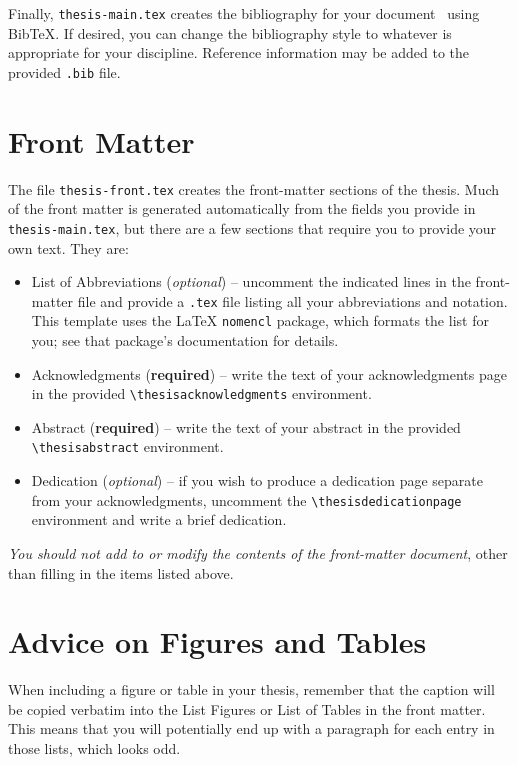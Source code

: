 Finally, \texttt{thesis-main.tex} creates the bibliography for your document~\cite{Lovecraft1928} using BibTeX. If desired, you can change the bibliography style to whatever is appropriate for your discipline. Reference information may be added to the provided \texttt{.bib} file.

\section{Front Matter}

The file \texttt{thesis-front.tex} creates the front-matter sections of the thesis.  Much of the front matter is generated automatically from the fields you provide in \texttt{thesis-main.tex}, but there are a few sections that require you to provide your own text.  They are:

\begin{itemize}

\item List of Abbreviations (\textit{optional}) -- uncomment the indicated lines in the front-matter file and provide a \texttt{.tex} file listing all your abbreviations and notation. This template uses the LaTeX \texttt{nomencl} package, which formats the list for you; see that package's documentation for details.

\item Acknowledgments (\textbf{required}) -- write the text of your acknowledgments page in the provided \texttt{\textbackslash thesisacknowledgments} environment.

\item Abstract (\textbf{required}) -- write the text of your abstract in the provided \texttt{\textbackslash thesisabstract} environment.

\item Dedication (\textit{optional}) -- if you wish to produce a dedication page separate from your acknowledgments, uncomment the \texttt{\textbackslash thesisdedicationpage} environment and write a brief dedication.

\end{itemize}
\emph{You should not add to or modify the contents of the front-matter document}, other than filling in the items listed above.

\section{Advice on Figures and Tables}

When including a figure or table in your thesis, remember that the caption will be copied verbatim into the List Figures or List of Tables in the front matter.  This means that you will potentially end up with a paragraph for each entry in those lists, which looks odd.

